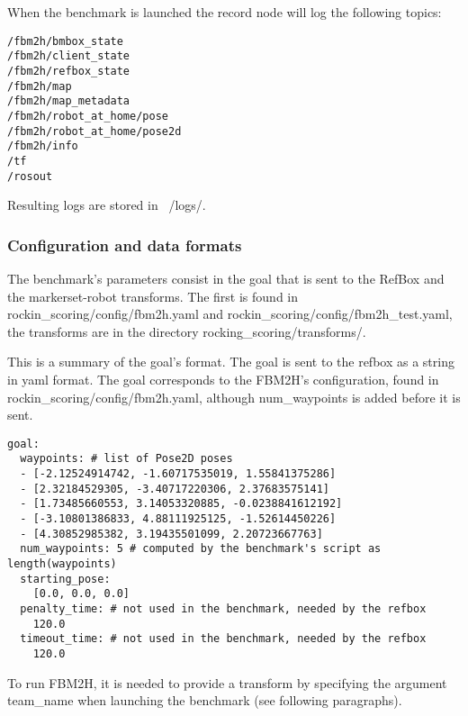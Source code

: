 \documentclass[a4paper]{article}
\begin{document}
\label{sec:fbm2h_record_node}

When the benchmark is launched the record node will log the following topics:

\begin{verbatim}
/fbm2h/bmbox_state
/fbm2h/client_state
/fbm2h/refbox_state
/fbm2h/map
/fbm2h/map_metadata
/fbm2h/robot_at_home/pose
/fbm2h/robot_at_home/pose2d
/fbm2h/info
/tf
/rosout
\end{verbatim} 

Resulting logs are stored in ~/logs/.

\clearpage

\subsubsection{Configuration and data formats}

The benchmark's parameters consist in the goal that is sent to the RefBox and the markerset-robot transforms.
The first is found in rockin\_scoring/config/fbm2h.yaml and rockin\_scoring/config/fbm2h\_test.yaml, the transforms are in the directory rocking\_scoring/transforms/.


\label{sec:fbm2h_goal_data_format}

This is a summary of the goal's format. The goal is sent to the refbox as a string in yaml format.
The goal corresponds to the FBM2H's configuration, found in rockin\_scoring/config/fbm2h.yaml, although num\_waypoints is added before it is sent.

\begin{verbatim}
goal:
  waypoints: # list of Pose2D poses
  - [-2.12524914742, -1.60717535019, 1.55841375286]
  - [2.32184529305, -3.40717220306, 2.37683575141]
  - [1.73485660553, 3.14053320885, -0.0238841612192]
  - [-3.10801386833, 4.88111925125, -1.52614450226]
  - [4.30852985382, 3.19435501099, 2.20723667763]
  num_waypoints: 5 # computed by the benchmark's script as length(waypoints)
  starting_pose:
    [0.0, 0.0, 0.0]
  penalty_time: # not used in the benchmark, needed by the refbox
    120.0
  timeout_time: # not used in the benchmark, needed by the refbox
    120.0
\end{verbatim} 


\label{sec:fbm2h_transform_data_format}

To run FBM2H, it is needed to provide a transform by specifying the argument team\_name when launching the benchmark (see following paragraphs).
\end{document}
